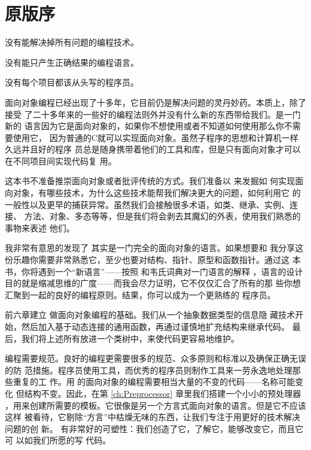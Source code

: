 \newpage{\thispagestyle{empty}\cleardoublepage}

\chapter{原版序}
\label{ch:OrigPreface}

\begin{flushright}
    没有能解决掉所有问题的编程技术。

    没有能只产生正确结果的编程语言。

    没有每个项目都该从头写的程序员。

\end{flushright}

面向对象编程已经出现了十多年，它目前仍是解决问题的灵丹妙药。本质上，除了接受
了二十多年来的一些好的编程法则外并没有什么新的东西带给我们。\cpp 是一门新的
语言因为它是面向对象的，如果你不想使用或者不知道如何使用那么你不需要使用它，
因为普通的C就可以实现面向对象。虽然子程序的思想和计算机一样久远并且好的程序
员总是随身携带着他们的工具和库，但是只有面向对象才可以在不同项目间实现代码复
用。

这本书不准备推崇面向对象或者批评传统的方式。我们准备以 来发掘如
何实现面向对象，有哪些技术，为什么这些技术能帮我们解决更大的问题，如何利用它
的一般性以及更早的捕获异常。虽然我们会接触很多术语，如类、继承、实例、连接、
方法、对象、多态等等，但是我们将会剥去其魔幻的外表，使用我们熟悉的事物来表述
他们。

我非常有意思的发现了 其实是一门完全的面向对象的语言。如果想要和
我分享这份乐趣你需要非常熟悉它，至少也要对结构、指针、原型和函数指针。通过这
本书，你将遇到一个“新语言”——按照 和韦氏词典对一门语言的解释
，语言的设计目的就是缩减思维的广度——而我会尽力证明，它不仅仅汇合了所有的那
些你想汇聚到一起的良好的编程原则。结果，你可以成为一个更熟练的
程序员。

前六章建立 做面向对象编程的基础。我们从一个抽象数据类型的信息隐
藏技术开始，然后加入基于动态连接的通用函数，再通过谨慎地扩充结构来继承代码。
最后，我们将上述所有放进一个类树中，来使代码更容易地维护。

编程需要规范。良好的编程更需要很多的规范、众多原则和标准以及确保正确无误的防
范措施。程序员使用工具，而优秀的程序员则制作工具来一劳永逸地处理那些重复的工
作。用 的面向对象的编程需要相当大量的不变的代码——名称可能变化
但结构不变。因此，在第 \ref{ch:Preprocessor} 章里我们搭建一个小小的预处理器
，用来创建所需要的模板。它很像是另一个方言式面向对象的语言。但是它不应该这样
被看待，它剔除“方言”中枯燥无味的东西，让我们专注于用更好的技术解决问题的创
新。 有非常好的可塑性：我们创造了它，了解它，能够改变它，而且它可
以如我们所愿的写  代码。

